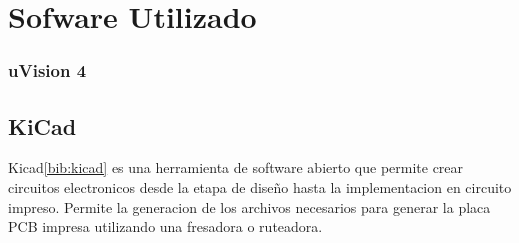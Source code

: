\section{Sofware Utilizado} %
\label{sec:sofware_utilizado}


\subsubsection{uVision 4} %
\label{ssub:uvision_4}



\subsection{KiCad} %
\label{sub:kicad}

Kicad\ref{bib:kicad} es una herramienta de software abierto que permite crear circuitos electronicos desde la etapa de dise\~no hasta la implementacion en circuito impreso. Permite la generacion de los archivos necesarios para generar la placa PCB impresa utilizando una fresadora o ruteadora.  



\clearpage



